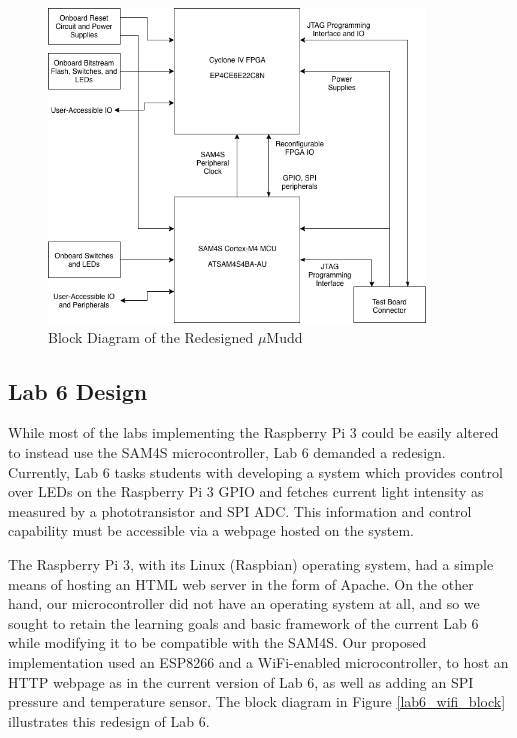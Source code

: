 \documentclass[12pt]{article}
\begin{document}
    \begin{figure}[h]
        \label{pcb_block}
        \begin{center}
            \includegraphics[width=10cm]{blockdiagrampcb.png}
            \caption{Block Diagram of the Redesigned $\mu$Mudd}
        \end{center}
    \end{figure}
    
\subsection{Lab 6 Design}
    While most of the labs implementing the Raspberry Pi 3 could be easily altered to instead use the SAM4S microcontroller, Lab 6 demanded a redesign. Currently, Lab 6 tasks students with developing a system which provides control over LEDs on the Raspberry Pi 3 GPIO and fetches current light intensity as measured by a phototransistor and SPI ADC. This information and control capability must be accessible via a webpage hosted on the system.
    
    The Raspberry Pi 3, with its Linux (Raspbian) operating system, had a simple means of hosting an HTML web server in the form of Apache. On the other hand, our microcontroller did not have an operating system at all, and so we sought to retain the learning goals and basic framework of the current Lab 6 while modifying it to be compatible with the SAM4S. Our proposed implementation used an ESP8266 and a WiFi-enabled microcontroller, to host an HTTP webpage as  in the current version of Lab 6, as well as adding an SPI pressure and temperature sensor. The block diagram in Figure \ref{lab6_wifi_block} illustrates this redesign of Lab 6.
\end{document}
